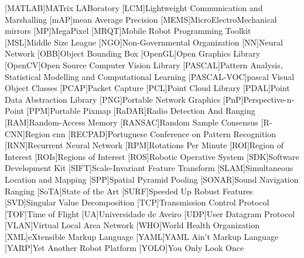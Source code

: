 \begin{multicols}{2}
\begin{acronym}[AAAAAA]
	[MATLAB\textsuperscript{\tiny\textregistered}]{MATrix LABoratory\textsuperscript{\tiny\textregistered}}
	[LCM]{Lightweight Communication and Marshalling}
	[mAP]{mean Average Precision}
	[MEMS]{MicroElectroMechanical mirrors}
	[MP]{MegaPixel}
	[MRQT]{Mobile Robot Programming Toolkit}
	[MSL]{Middle Size League}
	[NGO]{Non-Governmental Organization} 
	[NN]{Neural Network}
	[OBB]{Object Bounding Box}
	[OpenGL]{Open Graphics Library}
	[OpenCV]{Open Source Computer Vision Library}
	[PASCAL]{Pattern Analysis, Statistical Modelling and Computational Learning} 
	[PASCAL-VOC]{\acl{pascal} Visual Object Classes}
	[PCAP]{Packet Capture}
	[PCL]{Point Cloud Library}
	[PDAL]{Point Data Abstraction Library}
	[PNG]{Portable Network Graphics}
	[PnP]{Perspective-n-Point}
	[PPM]{Portable Pixmap}
	[RaDAR]{Radio Detection And Ranging}
	[RAM]{Random-Access Memory}
	[RANSAC]{Random Sample Consensus}
	[R-CNN]{Region \acl{cnn}}
	[RECPAD]{Portuguese Conference on Pattern Recognition}
	[RNN]{Recurrent Neural Network}
	[RPM]{Rotations Per Minute}
	[ROI]{Region of Interest}
	[ROIs]{Regions of Interest}
	[ROS]{Robotic Operative System}
	[SDK]{Software Development Kit}
	[SIFT]{Scale-Invariant Feature Transform}
	[SLAM]{Simultaneous Location and Mapping} 
	[SPP]{Spatial Pyramid Pooling}
	[SONAR]{Sound Navigation Ranging}
	[SoTA]{State of the Art}
	[SURF]{Speeded Up Robust Features}
	[SVD]{Singular Value Decomposition}
	[TCP]{Transmission Control Protocol}
	[TOF]{Time of Flight} 
	[UA]{Universidade de Aveiro}
	[UDP]{User Datagram Protocol}
	[VLAN]{Virtual Local Area Network}
	[WHO]{World Health Organization}
	[XML]{eXtensible Markup Language}
	[YAML]{YAML Ain't Markup Language}
	[YARP]{Yet Another Robot Platform}
	[YOLO]{You Only Look Once}
\end{acronym}
\end{multicols}

